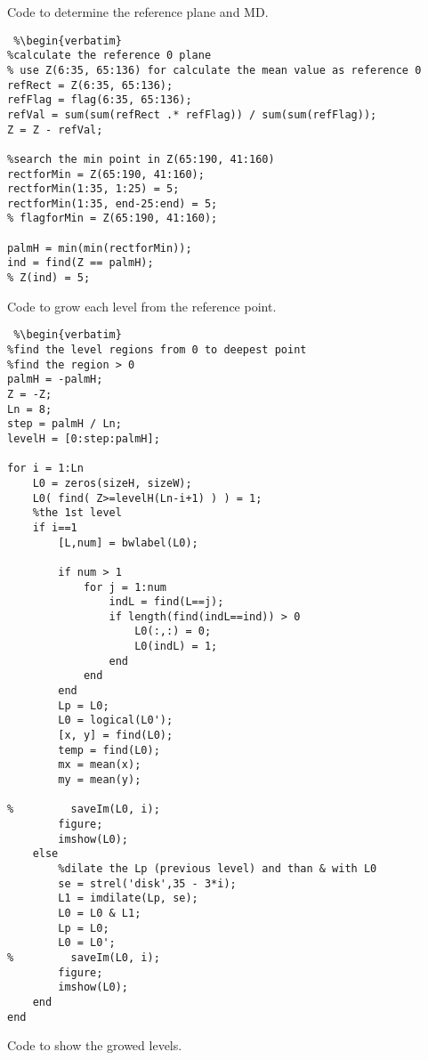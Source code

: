 Code to determine the reference plane and MD.

\begin{lstlisting} %\begin{verbatim}
%calculate the reference 0 plane
% use Z(6:35, 65:136) for calculate the mean value as reference 0
refRect = Z(6:35, 65:136);
refFlag = flag(6:35, 65:136);
refVal = sum(sum(refRect .* refFlag)) / sum(sum(refFlag));
Z = Z - refVal;

%search the min point in Z(65:190, 41:160)
rectforMin = Z(65:190, 41:160);
rectforMin(1:35, 1:25) = 5;
rectforMin(1:35, end-25:end) = 5;
% flagforMin = Z(65:190, 41:160);

palmH = min(min(rectforMin));
ind = find(Z == palmH);
% Z(ind) = 5;
\end{lstlisting} %
\clearpage

Code to grow each level from the reference point.

\begin{lstlisting} %\begin{verbatim}
%find the level regions from 0 to deepest point
%find the region > 0
palmH = -palmH;
Z = -Z;
Ln = 8;
step = palmH / Ln;
levelH = [0:step:palmH];

for i = 1:Ln
    L0 = zeros(sizeH, sizeW);
    L0( find( Z>=levelH(Ln-i+1) ) ) = 1;
    %the 1st level
    if i==1
        [L,num] = bwlabel(L0);

        if num > 1
            for j = 1:num
                indL = find(L==j);
                if length(find(indL==ind)) > 0
                    L0(:,:) = 0;
                    L0(indL) = 1;
                end
            end
        end
        Lp = L0;
        L0 = logical(L0');
        [x, y] = find(L0);
        temp = find(L0);
        mx = mean(x);
        my = mean(y);

%         saveIm(L0, i);
        figure;
        imshow(L0);
    else
        %dilate the Lp (previous level) and than & with L0
        se = strel('disk',35 - 3*i);
        L1 = imdilate(Lp, se);
        L0 = L0 & L1;
        Lp = L0;
        L0 = L0';
%         saveIm(L0, i);
        figure;
        imshow(L0);
    end
end
\end{lstlisting} %
\clearpage


Code to show the growed levels.

